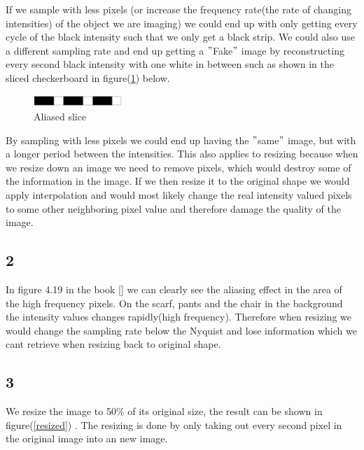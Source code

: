 {If we sample with less pixels (or increase the frequency rate(the rate of changing intensities) of the object we are imaging) we could end up with only getting every cycle of the black intensity such that we only get a black strip. We could also use a different sampling rate and end up getting a $"$Fake$"$ image by reconstructing every second black intensity with one white in between such as shown in the sliced checkerboard in figure(\ref{checker3}) below.
\begin{figure}[!htb]
    {\centering
        \includegraphics[width=0.30\textwidth]{checker3.png}
        \caption{Aliased slice}
        \label{checker3}
    \par}
    \end{figure}
By sampling with less pixels we could end up having the $"$same$"$ image, but with a longer period between the intensities. This also applies to resizing because when we resize down an image we need to remove pixels, which would destroy some of the information in the image. If we then resize it to the original shape we would apply interpolation and would most likely change the real intensity valued pixels to some other neighboring pixel value and therefore damage the quality of the image.

\subsection{2}

In figure 4.19 in the book [\cite{dip}] we can clearly see the aliasing effect in the area of the high frequency pixels. On the scarf, pants and the chair in the background the intensity values changes rapidly(high frequency). Therefore when resizing we would change the sampling rate below the Nyquist and lose information which we cant retrieve when resizing back to original shape.

\subsection{3}


We resize the image to 50\% of its original size, the result can be shown in figure(\ref{resized}) . The resizing is done by only taking out every second pixel in the original image into an new image.

}
